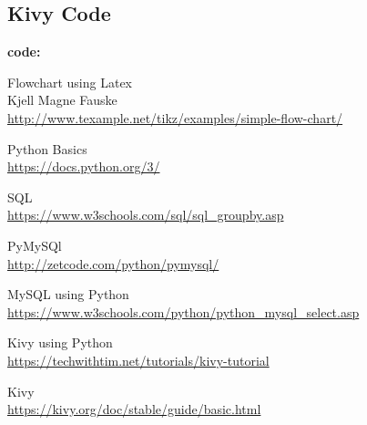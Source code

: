 \documentclass[12pt]{article}
\begin{document}
  \subsection*{Kivy Code}
  {\large \textbf{code:}}
  
  
\newpage
\begin{thebibliography}{11}
Flowchart using Latex\\
Kjell Magne Fauske \\
\url{http://www.texample.net/tikz/examples/simple-flow-chart/}

Python Basics \\
\url{https://docs.python.org/3/}

SQL\\
\url{https://www.w3schools.com/sql/sql_groupby.asp}

PyMySQl\\
\url{http://zetcode.com/python/pymysql/}

MySQL using Python\\
\url{https://www.w3schools.com/python/python_mysql_select.asp}

Kivy using Python\\
\url{https://techwithtim.net/tutorials/kivy-tutorial}

Kivy\\
\url{https://kivy.org/doc/stable/guide/basic.html}

\end{thebibliography}

   
   
\end{document}
